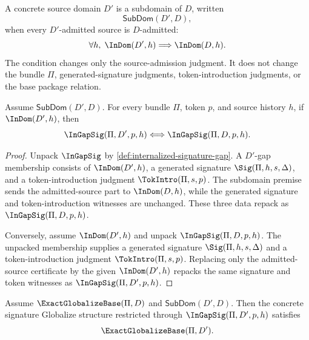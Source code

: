 \begin{definition}
\label{def:concrete-source-subdomain}
A concrete source domain $D'$ is a subdomain of $D$, written
$$
  \mathsf{SubDom}(D',D),
$$
when every $D'$-admitted source is $D$-admitted:
$$
  \forall h,\;\InDom(D',h)\Longrightarrow\InDom(D,h).
$$
The condition changes only the source-admission judgment. It does not change the bundle $\Pi$, generated-signature judgments, token-introduction judgments, or the base package relation.
\end{definition}

\begin{lemma}
\label{lem:subdomain-gap-base-change}
Assume $\mathsf{SubDom}(D',D)$. For every bundle $\Pi$, token $p$, and source history $h$, if $\InDom(D',h)$, then
$$
  \InGapSig(\Pi,D',p,h)
  \Longleftrightarrow
  \InGapSig(\Pi,D,p,h).
$$
\end{lemma}

\begin{proof}
Unpack $\InGapSig$ by \autoref{def:internalized-signature-gap}. A $D'$-gap membership consists of $\InDom(D',h)$, a generated signature $\Sig(\Pi,h,s,\Delta)$, and a token-introduction judgment $\TokIntro(\Pi,s,p)$. The subdomain premise sends the admitted-source part to $\InDom(D,h)$, while the generated signature and token-introduction witnesses are unchanged. These three data repack as $\InGapSig(\Pi,D,p,h)$.

Conversely, assume $\InDom(D',h)$ and unpack $\InGapSig(\Pi,D,p,h)$. The unpacked membership supplies a generated signature $\Sig(\Pi,h,s,\Delta)$ and a token-introduction judgment $\TokIntro(\Pi,s,p)$. Replacing only the admitted-source certificate by the given $\InDom(D',h)$ repacks the same signature and token witnesses as $\InGapSig(\Pi,D',p,h)$.
\end{proof}

\begin{theorem}
\label{thm:exact-globalize-base-subdomain-base-change}
Assume $\ExactGlobalizeBase(\Pi,D)$ and $\mathsf{SubDom}(D',D)$. Then the concrete signature Globalize structure restricted through $\InGapSig(\Pi,D',p,h)$ satisfies
$$
  \ExactGlobalizeBase(\Pi,D').
$$
\end{theorem}

